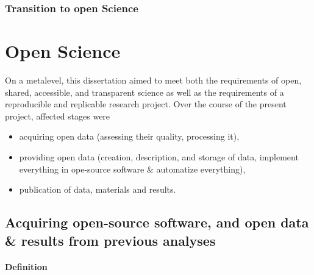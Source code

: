 \subsubsection{Transition to open Science}




\section{Open Science}

On a metalevel, this dissertation aimed to meet both the requirements of open,
shared, accessible, and transparent science \citep[cf.][]{watson2015will,
fecher2014open} as well as the requirements of a reproducible and replicable
research project.
%
Over the course of the present project, affected stages were


\begin{itemize}
    \item acquiring open data (assessing their quality, processing it),
    \item providing open data (creation, description, and storage of data,
        implement everything in ope-source software \& automatize everything),
    \item publication of data, materials and results.
\end{itemize}







\pagebreak

\subsection{Acquiring open-source software, and open data \& results from
previous analyses}

\paragraph[inline]{Definition}




